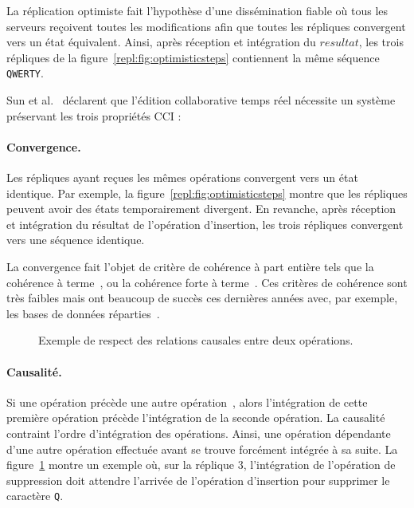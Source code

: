 \noindent La réplication optimiste fait l'hypothèse d'une dissémination fiable
où tous les serveurs reçoivent toutes les modifications afin que toutes les
répliques convergent vers un état équivalent. Ainsi, après réception et
intégration du $resultat$, les trois répliques de la
figure~\ref{repl:fig:optimisticsteps} contiennent la même séquence
\texttt{QWERTY}.

Sun et al.~\cite{sun1998achieving} déclarent que l'édition collaborative temps
réel nécessite un système préservant les trois propriétés CCI :

\paragraph{Convergence.} Les répliques ayant reçues les mêmes opérations
convergent vers un état identique. Par exemple, la
figure~\ref{repl:fig:optimisticsteps} montre que les répliques peuvent avoir des
états temporairement divergent. En revanche, après réception et intégration du
résultat de l'opération d'insertion, les trois répliques convergent vers une
séquence identique.

\noindent La convergence fait l'objet de critère de cohérence à part entière
tels que la cohérence à terme~\cite{bailis2013eventual}, ou la cohérence forte à
terme~\cite{shapiro2011conflict}. Ces critères de cohérence sont très faibles
mais ont beaucoup de succès ces dernières années avec, par exemple, les bases de
données réparties~\cite{dynamo, riak, cassandra, mongodb}.

\begin{figure}
  \begin{center}
    
    \caption[Exemple de respect des relations
    causales]{\label{repl:fig:causality}Exemple de respect des relations
      causales entre deux opérations.}
  \end{center}
\end{figure}

\paragraph{Causalité.} Si une opération précède une autre
opération~\cite{lamport1978time}, alors l'intégration de cette première
opération précède l'intégration de la seconde opération.  La causalité
contraint l'ordre d'intégration des opérations. Ainsi, une opération dépendante
d'une autre opération effectuée avant se trouve forcément intégrée à sa suite.
La figure~\ref{repl:fig:causality} montre un exemple où, sur la réplique 3,
l'intégration de l'opération de suppression doit attendre l'arrivée de
l'opération d'insertion pour supprimer le caractère \texttt{Q}.


